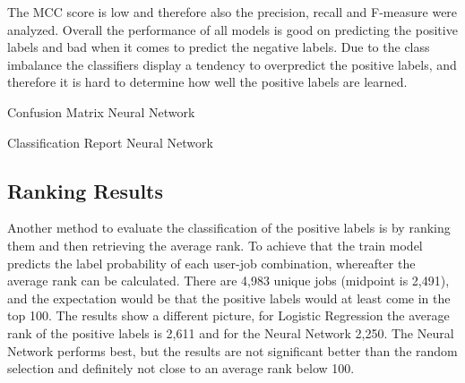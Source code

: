The MCC score is low and therefore also the precision, recall and F-measure were analyzed.
Overall the performance of all models is good on predicting the positive labels and bad when it comes to predict the negative labels.
Due to the class imbalance the classifiers display a tendency to overpredict the positive labels, and therefore it is hard to determine how well the positive labels are learned. 

\begin{table}[h]
\begin{footnotesize}

\end{footnotesize}
\caption{\label{tab:cmnn} Confusion Matrix Neural Network}
\end{table}

\begin{table}[h]
\begin{footnotesize}

\end{footnotesize}
\caption{\label{tab:crnn} Classification Report Neural Network}
\end{table}

\subsection{Ranking Results}
Another method to evaluate the classification of the positive labels is by ranking them and then retrieving the average rank.
To achieve that the train model predicts the label probability of each user-job combination, whereafter the average rank can be calculated.
There are 4,983 unique jobs (midpoint is 2,491), and the expectation would be that the positive labels would at least come in the top 100. 
The results show a different picture, for Logistic Regression the average rank of the positive labels is 2,611 and for the Neural Network 2,250.
The Neural Network performs best, but the results are not significant better than the random selection and definitely not close to an average rank below 100.






